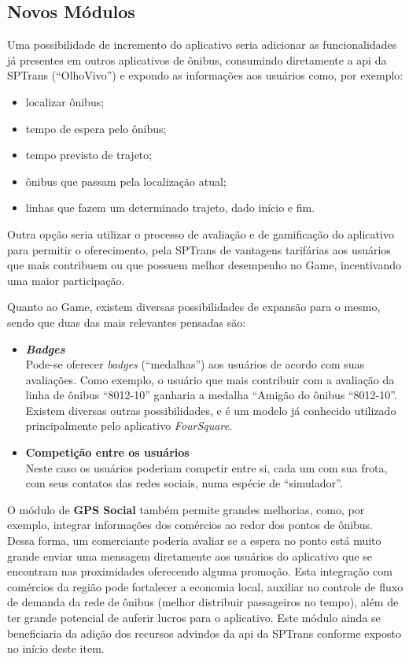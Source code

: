 \subsection{Novos Módulos}\label{subsec:futuro-novos-mod}
Uma possibilidade de incremento do aplicativo seria adicionar as funcionalidades já presentes em outros aplicativos de ônibus, consumindo diretamente a \gls{api} da SPTrans (``OlhoVivo'') e expondo as informações aos usuários como, por exemplo:
\begin{itemize}
    \item localizar ônibus;
    \item tempo de espera pelo ônibus;
    \item tempo previsto de trajeto;
    \item ônibus que passam pela localização atual;
    \item linhas que fazem um determinado trajeto, dado início e fim.
\end{itemize}

Outra opção seria utilizar o processo de avaliação e de gamificação do aplicativo para permitir o oferecimento, pela SPTrans de vantagens tarifárias aos usuários que mais contribuem ou que possuem melhor desempenho no Game, incentivando uma maior participação.

Quanto ao Game, existem diversas possibilidades de expansão para o mesmo, sendo que duas das mais relevantes pensadas são:
\begin{itemize}
    \item \textbf{\textit{Badges}} \hfill \\
    Pode-se oferecer \textit{badges} (``medalhas'') aos usuários de acordo com suas avaliações. Como exemplo, o usuário que mais contribuir com a avaliação da linha de ônibus ``8012-10'' ganharia a medalha ``Amigão do ônibus ``8012-10''. Existem diversas outras possibilidades, e é um modelo já conhecido utilizado principalmente pelo aplicativo \textit{FourSquare}.
    \item \textbf{Competição entre os usuários} \hfill \\
    Neste caso os usuários poderiam competir entre si, cada um com sua frota, com seus contatos das redes sociais, numa espécie de ``simulador''.
\end{itemize}

O módulo de \textbf{GPS Social} também permite grandes melhorias, como, por exemplo, integrar informações dos comércios ao redor dos pontos de ônibus. Dessa forma, um comerciante poderia avaliar se a espera no ponto está muito grande enviar uma mensagem diretamente aos usuários do aplicativo que se encontram nas proximidades oferecendo alguma promoção. Esta integração com comércios da região pode fortalecer a economia local, auxiliar no controle de fluxo de demanda da rede de ônibus (melhor distribuir passageiros no tempo), além de ter grande potencial de auferir lucros para o aplicativo.
Este módulo ainda se beneficiaria da adição dos recursos advindos da \gls{api} da SPTrans conforme exposto no início deste item.

